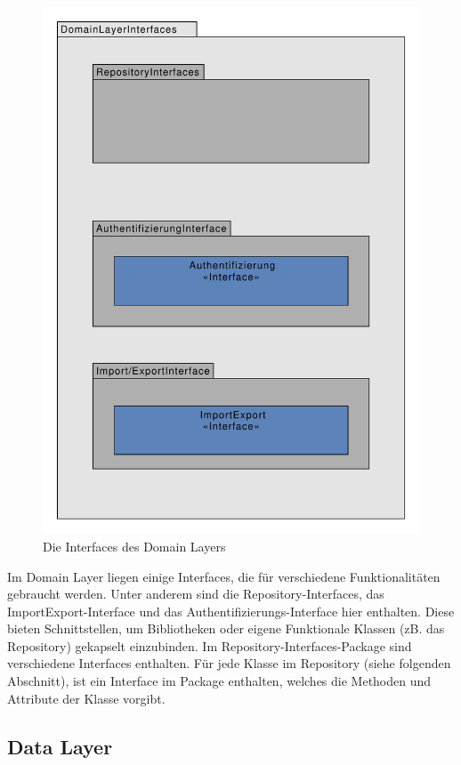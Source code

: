 \begin{figure}[H]
	\centering
	\includegraphics[width=\textwidth]{generatedpics/DomainLayerInterfaces.pdf}%
	\caption{Die Interfaces des Domain Layers}%
	\label{interf}%
\end{figure}

Im Domain Layer liegen einige Interfaces, die für verschiedene Funktionalitäten gebraucht werden. Unter anderem sind die Repository-Interfaces, das ImportExport-Interface und das Authentifizierungs-Interface hier enthalten. Diese bieten Schnittstellen, um Bibliotheken oder eigene Funktionale Klassen (zB. das Repository) gekapselt einzubinden.
Im Repository-Interfaces-Package sind verschiedene Interfaces enthalten. Für jede Klasse im Repository (siehe folgenden Abschnitt), ist ein Interface im Package enthalten, welches die Methoden und Attribute der Klasse vorgibt.

\subsection{Data Layer}

